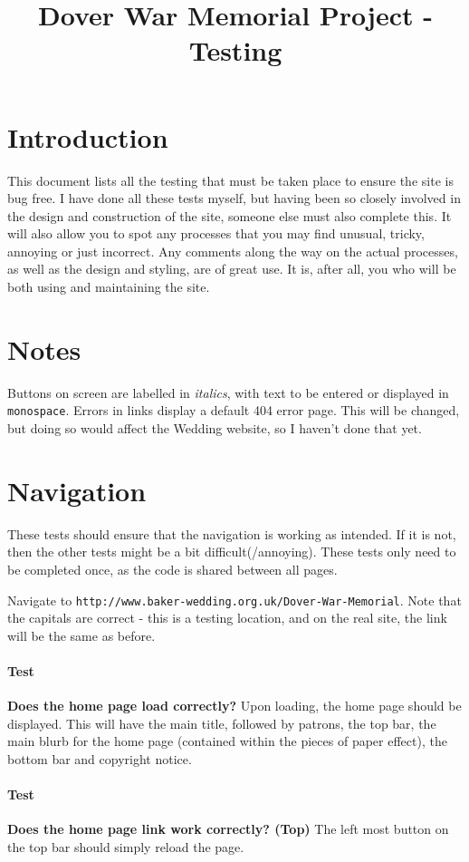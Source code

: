 \documentclass[12pt]{article}
\title{Dover War Memorial Project - Testing}
\date{}
\author{}
\newcounter{Test}
\newcommand{\test}[1]{%
\stepcounter{Test}%
\paragraph{Test \theTest} \textbf{#1} }
\begin{document}
\maketitle

\tableofcontents
\newpage

\section{Introduction}

This document lists all the testing that must be taken place to ensure the site is bug free. I have done all these tests myself, but having been so closely involved in the design and construction of the site, someone else must also complete this. It will also allow you to spot any processes that you may find unusual, tricky, annoying or just incorrect. Any comments along the way on the actual processes, as well as the design and styling, are of great use. It is, after all, you who will be both using and maintaining the site. \smiley

\section{Notes}
Buttons on screen are labelled in \textit{italics}, with text to be entered or displayed in \texttt{monospace}. Errors in links display a default 404 error page. This will be changed, but doing so would affect the Wedding website, so I haven't done that yet.

\section{Navigation}

These tests should ensure that the navigation is working as intended. If it is not, then the other tests might be a bit difficult(/annoying). These tests only need to be completed once, as the code is shared between all pages.

Navigate to \texttt{http://www.baker-wedding.org.uk/Dover-War-Memorial}. Note that the capitals are correct - this is a testing location, and on the real site, the link will be the same as before.
\test {Does the home page load correctly?}
Upon loading, the home page should be displayed. This will have the main title, followed by patrons, the top bar, the main blurb for the home page (contained within the pieces of paper effect), the bottom bar and copyright notice.

\test{Does the home page link work correctly? (Top)}
The left most button on the top bar should simply reload the page.
\end{document}
